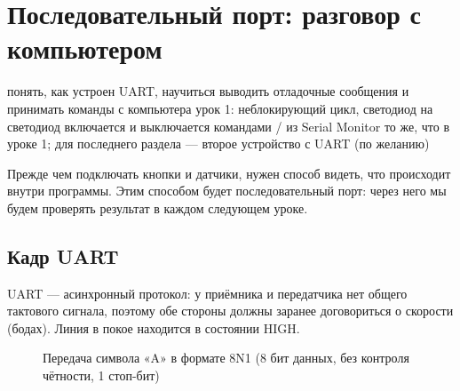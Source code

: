 \section{Последовательный порт: разговор с компьютером}\label{les:serial}
\lessonintro
  {понять, как устроен UART, научиться выводить отладочные сообщения и принимать команды с компьютера}
  {урок 1: неблокирующий цикл, светодиод на }
  {светодиод включается и выключается командами  /  из Serial Monitor}
  {то же, что в уроке 1; для последнего раздела --- второе устройство с UART (по желанию)}

Прежде чем подключать кнопки и датчики, нужен способ видеть, что происходит внутри
программы. Этим способом будет последовательный порт: через него мы будем проверять
результат в каждом следующем уроке.

\subsection{Кадр UART}

UART --- асинхронный протокол: у приёмника и передатчика нет общего тактового сигнала, поэтому обе стороны
должны заранее договориться о скорости (бодах). Линия в покое находится в состоянии HIGH.

\begin{figure}[H]
\centering
{}
\caption{Передача символа «A» в формате 8N1 (8 бит данных, без контроля чётности, 1 стоп-бит)}
\end{figure}

